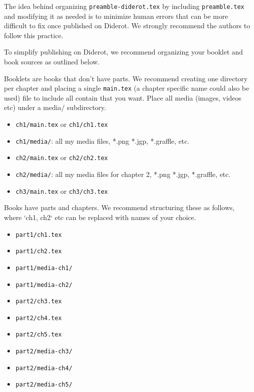 \begin{important}
The idea behind organizing \lstinline`preamble-diderot.tex` by including \lstinline`preamble.tex` and modifying it as needed is to minimize human errors that can be more difficult to fix once published on Diderot. 
%
We strongly recommend the authors to follow this practice.
\end{important}



To simplify publishing on Diderot, we recommend organizing your booklet and book sources as outlined below. 

\begin{gram}[Booklets]
Booklets are books that don't have parts. We recommend creating one directory per chapter and placing a single \lstinline`main.tex` (a chapter specific name could also be used) file to include all contain that you want.  
%
Place all media (images, videos etc) under a media/ subdirectory. 
\begin{itemize}  
\item \lstinline`ch1/main.tex` or \lstinline`ch1/ch1.tex`
\item \lstinline`ch1/media/`: all my media files, *.png *.jgp, *.graffle, etc.
\item \lstinline`ch2/main.tex` or \lstinline`ch2/ch2.tex`
\item \lstinline`ch2/media/`: all my media files for chapter 2, *.png *.jgp, *.graffle, etc.
\item \lstinline`ch3/main.tex` or \lstinline`ch3/ch3.tex`
\end{itemize}
\end{gram}

\begin{gram}[Books]
Books have parts and chapters. We recommend structuring these as follows, where `ch1, ch2` etc can be replaced with names of your choice.
%
\begin{itemize}
\item \lstinline`part1/ch1.tex`
\item \lstinline`part1/ch2.tex`
\item \lstinline`part1/media-ch1/`
\item \lstinline`part1/media-ch2/`
\item \lstinline`part2/ch3.tex`
\item \lstinline`part2/ch4.tex`
\item \lstinline`part2/ch5.tex`
\item \lstinline`part2/media-ch3/`
\item \lstinline`part2/media-ch4/`
\item \lstinline`part2/media-ch5/`
\end{itemize}
   
\end{gram}


